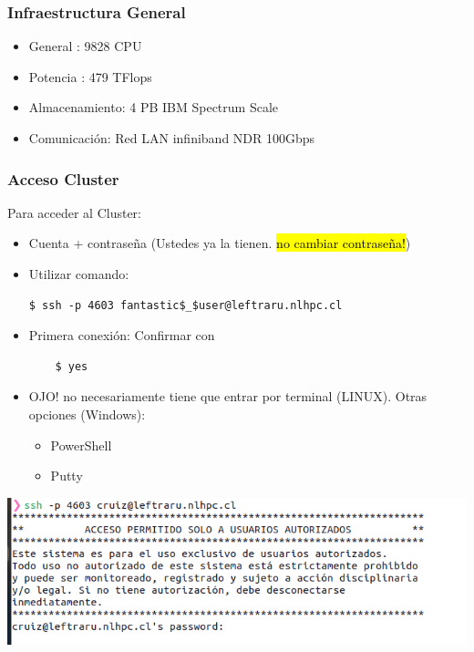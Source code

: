 \documentclass[aspectratio=169,professionalfonts]{beamer}
\begin{document}
\begin{frame}[fragile]
\frametitle{\textbf{Infraestructura General}}
\begin{itemize}
    \item General : 9828 CPU
        \vspace{0.5em} %
    \item Potencia : 479 TFlops
        \vspace{0.5em} %
    \item Almacenamiento: 4 PB IBM Spectrum Scale
        \vspace{0.5em} 
    \item Comunicación: Red LAN infiniband NDR 100Gbps
\end{itemize}
    
\end{frame}




\begin{frame}[fragile]
\frametitle{\textbf{Acceso Cluster}}

Para acceder al Cluster: 
\begin{itemize}
    \item Cuenta + contraseña (Ustedes ya la tienen. \hl{no cambiar contraseña!})
    
    \item Utilizar comando: 
     \begin{verbatim}
$ ssh -p 4603 fantastic$_$user@leftraru.nlhpc.cl
  \end{verbatim}
    \item Primera conexión: Confirmar con 
    \begin{verbatim}
    $ yes 
    \end{verbatim} 
    \item  OJO! no necesariamente tiene que entrar por terminal (LINUX). Otras opciones (Windows): 
        \begin{itemize}
            \item PowerShell
            \item Putty
        \end{itemize}
    \end{itemize}
    \centering
    \includegraphics[scale=0.3]{FIGURES/ssh_2.png}
     \vspace{0.5em}
\end{frame}
\end{document}
